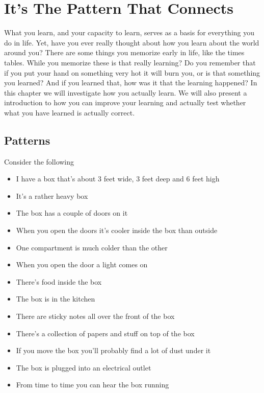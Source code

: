 \documentclass[]{memoir}
\begin{document}
\chapter{It's The Pattern That Connects}

What you learn, and your capacity to learn, serves as a basis for
everything you do in life. Yet, have you ever really thought about how
you learn about the world around you? There are some things you memorize
early in life, like the times tables. While you memorize these is that
really learning? Do you remember that if you put your hand on something
very hot it will burn you, or is that something you learned? And if you
learned that, how was it that the learning happened? In this chapter we
will investigate how you actually learn. We will also present a
introduction to how you can improve your learning and actually test
whether what you have learned is actually correct.

\section{Patterns}

Consider the following

\begin{itemize}
\itemsep1pt\parskip0pt
\item
  I have a box that's about 3 feet wide, 3 feet deep and 6 feet high
\item
  It's a rather heavy box
\item
  The box has a couple of doors on it
\item
  When you open the doors it's cooler inside the box than outside
\item
  One compartment is much colder than the other
\item
  When you open the door a light comes on
\item
  There's food inside the box
\item
  The box is in the kitchen
\item
  There are sticky notes all over the front of the box
\item
  There's a collection of papers and stuff on top of the box
\item
  If you move the box you'll probably find a lot of dust under it
\item
  The box is plugged into an electrical outlet
\item
  From time to time you can hear the box running
\end{itemize}
\end{document}

